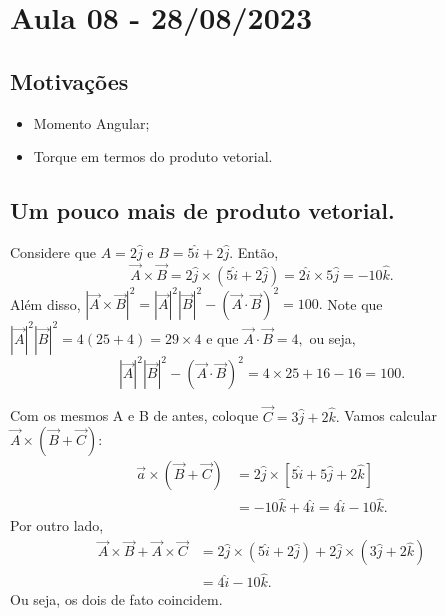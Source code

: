 \documentclass[physicsII_notes.tex]{subfiles}
\begin{document}
\section{Aula 08 - 28/08/2023}
\subsection{Motivações}
\begin{itemize}
	\item Momento Angular;
	\item Torque em termos do produto vetorial.
\end{itemize}
\subsection{Um pouco mais de produto vetorial.}
\begin{example}
	Considere que \(A = 2 \hat{j}\) e \(B = 5\hat{i} + 2 \hat{j}\). Então,
	\[
		\vec{A} \times{\vec{B}} = 2\hat{j} \times (5\hat{i} + 2\hat{j}) = 2\hat{i}\times 5\hat{j} = -10\hat{k}.
	\]
	Além disso, \(|\vec{A}\times \vec{B}|^{2} = |\vec{A}|^{2}|\vec{B}|^{2} - (\vec{A}\cdot \vec{B})^{2} = 100.\) Note que
	\(|\vec{A}|^{2}|\vec{B}|^{2} = 4 (25+4) = 29\times 4\) e que \(\vec{A}\cdot \vec{B} = 4, \) ou seja,
	\[
		|\vec{A}|^{2}|\vec{B}|^{2} - (\vec{A}\cdot \vec{B})^{2} = 4\times 25 + 16 - 16 = 100.
	\]
\end{example}
\begin{example}
	Com os mesmos A e B de antes, coloque \(\vec{C} = 3\hat{j} + 2 \hat{k}.\) Vamos calcular \(\vec{A}\times(\vec{B} + \vec{C}):\)
	\begin{align*}
		\vec{a}\times(\vec{B}+\vec{C}) & = 2\hat{j} \times [5\hat{i} + 5\hat{j} + 2\hat{k}] \\
		                               & = - 10\hat{k} + 4\hat{i} = 4\hat{i} - 10\hat{k}.
	\end{align*}
	Por outro lado,
	\begin{align*}
		\vec{A} \times \vec{B} + \vec{A} \times \vec{C} & = 2\hat{j}\times(5\hat{i} + 2\hat{j}) + 2\hat{j}\times(3\hat{j}+2\hat{k}) \\
		                                                & = 4\hat{i} - 10\hat{k}.
	\end{align*}
	Ou seja, os dois de fato coincidem.
\end{example}
\end{document}
